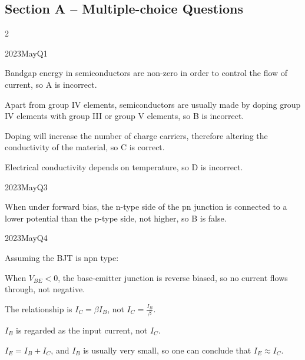 
\subsection*{Section A -- Multiple-choice Questions}
\begin{multicols*}{2}

\begin{qsolution}{2023}{May}{Q1}{\tgElectronics \tgElectronicsSemiconductor}

    \begin{enumualpha}
        \item Bandgap energy in semiconductors are non-zero in order to control the flow of current, so A is incorrect.
        \item Apart from group IV elements, semiconductors are usually made by doping group IV elements with group III or group V elements, so B is incorrect.
        \item Doping will increase the number of charge carriers, therefore altering the conductivity of the material, so C is correct.
        \item Electrical conductivity depends on temperature, so D is incorrect.
    \end{enumualpha}
\end{qsolution}

\begin{qsolution}{2023}{May}{Q3}{\tgElectronics \tgElectronicsSemiconductor}

    When under forward bias, the n-type side of the pn junction is connected to a lower potential than the p-type side, not higher, so B is false.
\end{qsolution}

\begin{qsolution}{2023}{May}{Q4}{\tgElectronics \tgElectronicsBJT}

    Assuming the BJT is npn type:
    \begin{enumualpha}
        \item When $V_{BE}<0$, the base-emitter junction is reverse biased, so no current flows through, not negative.
        \item The relationship is $I_C=\beta I_B$, not $\displaystyle I_C=\frac{I_B}{\beta}$.
        \item $I_B$ is regarded as the input current, not $I_C$.
        \item $I_E=I_B+I_C$, and $I_B$ is usually very small, so one can conclude that $I_E\approx I_C$.
    \end{enumualpha}
\end{qsolution}


\end{multicols*}
